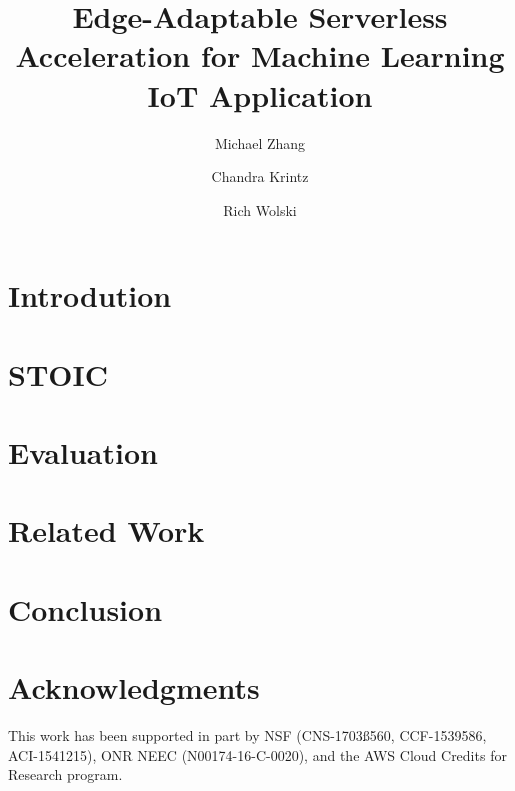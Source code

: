 \documentclass[sigplan, anonymous, authorversion]{acmart}
\begin{document}
\title{Edge-Adaptable Serverless Acceleration for Machine Learning IoT Application}
\author{Michael Zhang}
\author{Chandra Krintz}
\author{Rich Wolski}





\begin{abstract}
\label{sec:abstract}

\end{abstract}

\maketitle



\section{Introdution}
\label{sec:intro}


\section{STOIC}
\label{sec:stoic}


\section{Evaluation}
\label{sec:results}


\section{Related Work}
\label{sec:related}



\section{Conclusion}
\label{sec:conc}


\section*{Acknowledgments}
This work has been supported in part by NSF (CNS-1703ß560, CCF-1539586,
ACI-1541215), ONR NEEC (N00174-16-C-0020),
and the AWS Cloud Credits for Research program.



% 


\end{document}
